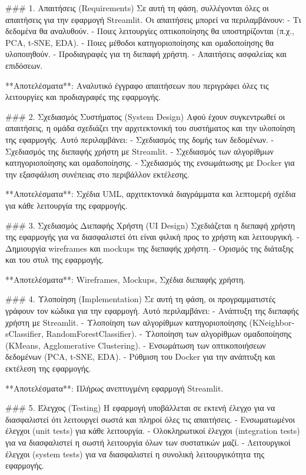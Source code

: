 \documentclass[a4paper,12pt]{article}
\begin{document}
### 1. Απαιτήσεις (\textlatin{Requirements})
Σε αυτή τη φάση, συλλέγονται όλες οι απαιτήσεις για την εφαρμογή \textlatin{Streamlit}. Οι απαιτήσεις μπορεί να περιλαμβάνουν:
- Τι δεδομένα θα αναλυθούν.
- Ποιες λειτουργίες οπτικοποίησης θα υποστηρίζονται (π.χ., \textlatin{PCA}, \textlatin{t-SNE}, \textlatin{EDA}).
- Ποιες μέθοδοι κατηγοριοποίησης και ομαδοποίησης θα υλοποιηθούν.
- Προδιαγραφές για τη διεπαφή χρήστη.
- Απαιτήσεις ασφαλείας και επιδόσεων.

**Αποτελέσματα**: Αναλυτικό έγγραφο απαιτήσεων που περιγράφει όλες τις λειτουργίες και προδιαγραφές της εφαρμογής.

### 2. Σχεδιασμός Συστήματος (\textlatin{System Design})
Αφού έχουν συγκεντρωθεί οι απαιτήσεις, η ομάδα σχεδιάζει την αρχιτεκτονική του συστήματος και την υλοποίηση της εφαρμογής. Αυτό περιλαμβάνει:
- Σχεδιασμός της δομής των δεδομένων.
- Σχεδιασμός της διεπαφής χρήστη με \textlatin{Streamlit}.
- Σχεδιασμός των αλγορίθμων κατηγοριοποίησης και ομαδοποίησης.
- Σχεδιασμός της ενσωμάτωσης με \textlatin{Docker} για την εξασφάλιση συνέπειας στο περιβάλλον εκτέλεσης.

**Αποτελέσματα**: Σχέδια \textlatin{UML}, αρχιτεκτονικά διαγράμματα και λεπτομερή σχέδια για κάθε λειτουργία της εφαρμογής.

### 3. Σχεδιασμός Διεπαφής Χρήστη (\textlatin{UI Design})
Σχεδιάζεται η διεπαφή χρήστη της εφαρμογής για να διασφαλιστεί ότι είναι φιλική προς το χρήστη και λειτουργική.
- Δημιουργία \textlatin{wireframes} και \textlatin{mockups} της διεπαφής χρήστη.
- Ορισμός της διάταξης και του στυλ της εφαρμογής.

**Αποτελέσματα**: \textlatin{Wireframes}, \textlatin{Mockups}, Σχέδια διεπαφής χρήστη.

### 4. Υλοποίηση (\textlatin{Implementation})
Σε αυτή τη φάση, οι προγραμματιστές γράφουν τον κώδικα για την εφαρμογή. Αυτό περιλαμβάνει:
- Ανάπτυξη της διεπαφής χρήστη με \textlatin{Streamlit}.
- Υλοποίηση των αλγορίθμων κατηγοριοποίησης (\textlatin{KNeighborsClassifier}, \textlatin{RandomForestClassifier}).
- Υλοποίηση των αλγορίθμων ομαδοποίησης (\textlatin{KMeans}, \textlatin{Agglomerative Clustering}).
- Ενσωμάτωση των οπτικοποιήσεων δεδομένων (\textlatin{PCA}, \textlatin{t-SNE}, \textlatin{EDA}).
- Ρύθμιση του \textlatin{Docker} για την ανάπτυξη και εκτέλεση της εφαρμογής.

**Αποτελέσματα**: Πλήρως ανεπτυγμένη εφαρμογή \textlatin{Streamlit}.

### 5. Έλεγχος (\textlatin{Testing})
Η εφαρμογή υποβάλλεται σε εκτενή έλεγχο για να διασφαλιστεί ότι λειτουργεί σωστά και πληροί όλες τις απαιτήσεις.
- Ενσωματωμένοι έλεγχοι (\textlatin{unit tests}) για κάθε λειτουργία.
- Ολοκληρωτικοί έλεγχοι (\textlatin{integration tests}) για να διασφαλιστεί η σωστή λειτουργία όλων των συστατικών μαζί.
- Λειτουργικοί έλεγχοι (\textlatin{system tests}) για να διασφαλιστεί η συνολική λειτουργικότητα της εφαρμογής.
\end{document}
